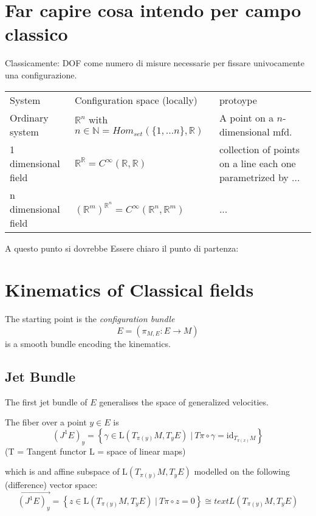 \documentclass[a4paper,12pt,fleqn]{article}  %
\begin{document}
\section{Far capire cosa intendo per campo classico}
Classicamente: DOF come numero di misure necessarie per fissare univocamente una configurazione.
\begin{table}[]
\begin{tabular}{lll}
	System & Configuration space (locally) & protoype 
 	\\
	Ordinary system & $\mathbb{R}^n$ with $n\in \mathbb{N} = Hom_{set}(\{1,\ldots n\}, \mathbb{R})$ & A point on a $n$-dimensional mfd.
	\\
	1 dimensional field & $\mathbb{R}^\mathbb{R} = C^\infty(\mathbb{R},\mathbb{R})$ & collection of points on a line each one parametrized by ...
	\\
	n dimensional field & $(\mathbb{R}^m)^{\mathbb{R}^n} = C^\infty (\mathbb{R}^n, \mathbb{R}^m)$ & ...
\end{tabular}
\end{table}

A questo punto si dovrebbe Essere chiaro il punto di partenza:
\\

\section{Kinematics of Classical fields}
The starting point is the \emph{configuration bundle} 
 	\begin{displaymath}
 		E = \left( \pi_{M,E} : E\rightarrow M \right)
 	\end{displaymath}
is a smooth bundle encoding the kinematics.

\subsection{Jet Bundle}
The first jet bundle of $E$ generalises the space of generalized velocities.

The fiber over a point $y\in E$ is
\begin{displaymath}
	\left( J^1 E\right)_y = \left\lbrace \gamma \in \text{L}(T_{\pi(y)}M, T_y E) \; \vert \: T\pi \circ \gamma = \text{id}_{T_{\pi(x)} M} \right\rbrace
\end{displaymath}
(T = Tangent functor L = space of linear maps)

which is and affine subspace of $\text{L}(T_{\pi(y)}M, T_y E)$ modelled on the following (difference) vector space:
\begin{displaymath}
	\vec{\left( J^1 E\right)_y} = \left\lbrace z \in \text{L}(T_{\pi(y)}M, T_y E) \; \vert \: T\pi \circ z = 0 \right\rbrace
	\cong text{L}(T_{\pi(y)}M, T_y E)
\end{displaymath}
\end{document}
